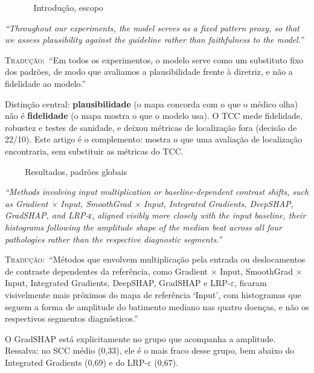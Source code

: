 \documentclass[11pt,a4paper]{article}
\newcommand{\pagechip}[1]{{\setlength{\fboxsep}{1.5pt}\colorbox{cAcc}{\textcolor{white}{\scriptsize\texttt{#1}}}}}
\newenvironment{origquote}{\par\itshape\small}{\par}
\newenvironment{tradquote}{\par\small\textsc{Tradução:}\ }{\par}
\newcommand{\explab}[1]{\par\smallskip{\small\color{cAcc}\textbf{\MakeUppercase{#1}}}\par}
\begin{document}
\begin{citacard}{\pagechip{p. 2--3} Introdução, escopo}
\begin{origquote}“Throughout our experiments, the model serves as a fixed pattern proxy, so that we assess plausibility against the guideline rather than faithfulness to the model.”\end{origquote}
\begin{tradquote}“Em todos os experimentos, o modelo serve como um substituto fixo dos padrões, de modo que avaliamos a plausibilidade frente à diretriz, e não a fidelidade ao modelo.”\end{tradquote}
\explab{Explicação}
Distinção central: \textbf{plausibilidade} (o mapa concorda com o que o médico olha) não é \textbf{fidelidade} (o mapa mostra o que o modelo usa). O TCC mede fidelidade, robustez e testes de sanidade, e deixou métricas de localização fora (decisão de 22/10). Este artigo é o complemento: mostra o que uma avaliação de localização encontraria, sem substituir as métricas do TCC.
\end{citacard}

\begin{citacard}{\pagechip{p. 3} Resultados, padrões globais}
\begin{origquote}“Methods involving input multiplication or baseline-dependent contrast shifts, such as Gradient × Input, SmoothGrad × Input, Integrated Gradients, DeepSHAP, GradSHAP, and LRP-ε, aligned visibly more closely with the input baseline, their histograms following the amplitude shape of the median beat across all four pathologies rather than the respective diagnostic segments.”\end{origquote}
\begin{tradquote}“Métodos que envolvem multiplicação pela entrada ou deslocamentos de contraste dependentes da referência, como Gradient $\times$ Input, SmoothGrad $\times$ Input, Integrated Gradients, DeepSHAP, GradSHAP e LRP-$\varepsilon$, ficaram visivelmente mais próximos do mapa de referência ‘Input’, com histogramas que seguem a forma de amplitude do batimento mediano nas quatro doenças, e não os respectivos segmentos diagnósticos.”\end{tradquote}
\explab{Explicação}
O GradSHAP está explicitamente no grupo que acompanha a amplitude. Ressalva: no SCC médio (0,33), ele é o mais fraco desse grupo, bem abaixo do Integrated Gradients (0,69) e do LRP-$\varepsilon$ (0,67).
\end{citacard}
\end{document}
